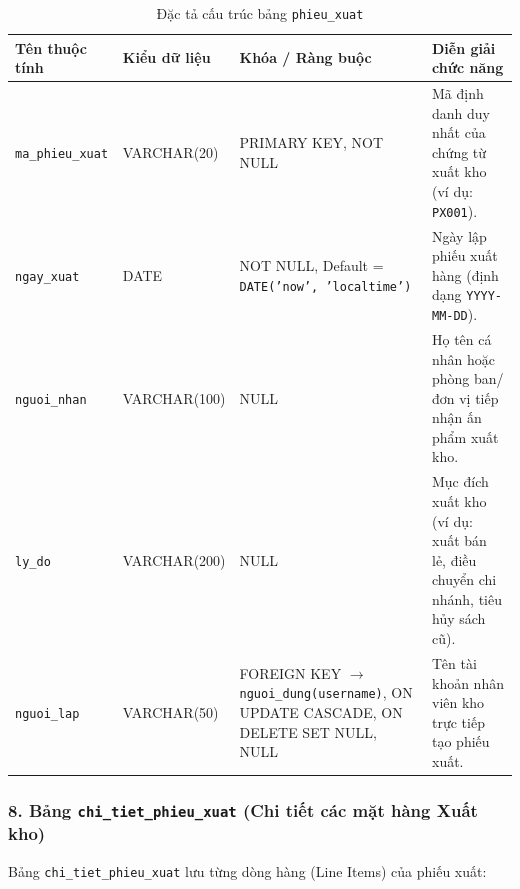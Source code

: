\documentclass[12pt,a4paper]{article}
\begin{document}
\begin{table}[H]
\centering
\small
\renewcommand{\arraystretch}{1.2}
\begin{tabularx}{\textwidth}{|>{\raggedright\arraybackslash}p{3.0cm}|>{\raggedright\arraybackslash}p{2.6cm}|>{\raggedright\arraybackslash}p{3.8cm}|>{\raggedright\arraybackslash}X|}
\hline
\textbf{Tên thuộc tính} & \textbf{Kiểu dữ liệu} & \textbf{Khóa / Ràng buộc} & \textbf{Diễn giải chức năng} \\
\hline
\texttt{ma\_phieu\_xuat} & VARCHAR(20) & PRIMARY KEY, NOT NULL & Mã định danh duy nhất của chứng từ xuất kho (ví dụ: \texttt{PX001}). \\
\hline
\texttt{ngay\_xuat} & DATE & NOT NULL, Default = \texttt{DATE('now', 'localtime')} & Ngày lập phiếu xuất hàng (định dạng \texttt{YYYY-MM-DD}). \\
\hline
\texttt{nguoi\_nhan} & VARCHAR(100) & NULL & Họ tên cá nhân hoặc phòng ban/đơn vị tiếp nhận ấn phẩm xuất kho. \\
\hline
\texttt{ly\_do} & VARCHAR(200) & NULL & Mục đích xuất kho (ví dụ: xuất bán lẻ, điều chuyển chi nhánh, tiêu hủy sách cũ). \\
\hline
\texttt{nguoi\_lap} & VARCHAR(50) & FOREIGN KEY $\rightarrow$ \texttt{nguoi\_dung(username)}, ON UPDATE CASCADE, ON DELETE SET NULL, NULL & Tên tài khoản nhân viên kho trực tiếp tạo phiếu xuất. \\
\hline
\end{tabularx}
\caption{Đặc tả cấu trúc bảng \texttt{phieu\_xuat}}
\label{tab:csdl-phieuxuat}
\end{table}

\subsubsection*{8. Bảng \texttt{chi\_tiet\_phieu\_xuat} (Chi tiết các mặt hàng Xuất kho)}
Bảng \texttt{chi\_tiet\_phieu\_xuat} lưu từng dòng hàng (Line Items) của phiếu xuất:
\end{document}
